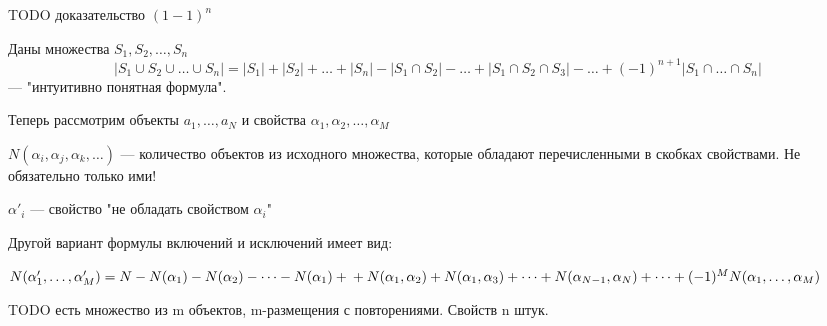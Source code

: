 TODO доказательство $(1-1)^n$

\begin{incexc} 
Даны множества $ S_1, S_2, \dots , S_n $
\[ |S_1 \cup S_2 \cup \dots \cup S_n| = |S_1| + |S_2| + \dots + |S_n| - |S_1 \cap S_2| - \dots + |S_1 \cap S_2 \cap S_3| - \dots + (-1)^{n+1} |S_1 \cap \dots \cap S_n|
\]
--- "интуитивно понятная формула". 
\end{incexc}

Теперь рассмотрим объекты $ a_1, \dots, a_N$ и свойства $ \alpha _1, \alpha _2, \dots, \alpha _M$ 

$ N(\alpha _i , \alpha _j, \alpha _k, \dots) $ --- количество объектов из исходного множества, которые обладают перечисленными в скобках свойствами. Не обязательно только ими!

$ \alpha ' _i $ --- свойство "не обладать свойством  $ \alpha _i $"

Другой вариант формулы включений и исключений имеет вид:

$N(\alpha'_1, \dots, \alpha'_M) = N - N(\alpha_1) - N(\alpha_2) - \dots - N(\alpha_1) + \\
+ N(\alpha_1,\alpha_2) + N(\alpha_1,\alpha_3) + \dots + N(\alpha_{N-1},\alpha_N) + \dots + (-1)^M N(\alpha_1,\dots, \alpha_M)  $

TODO есть множество из m объектов, m-размещения с повторениями. Свойств n штук.

